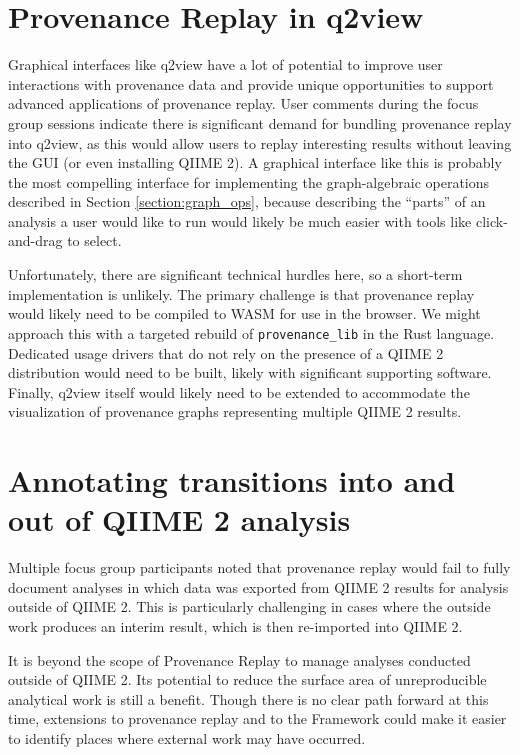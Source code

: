 \section{Provenance Replay in q2view \parencite[Issue 123]{qiime_2_development_team_issues_2016}}
Graphical interfaces like q2view have a lot of potential to improve user
interactions with provenance data and provide unique opportunities to support
advanced applications of provenance replay. User comments during the focus group
sessions indicate there is significant demand for bundling provenance replay
into q2view, as this would allow users to replay interesting results without
leaving the GUI (or even installing QIIME 2). A graphical interface like this is
probably the most compelling interface for implementing the graph-algebraic
operations described in Section \ref{section:graph_ops}, because describing
the “parts” of an analysis a user would like to run would likely be much easier
with tools like click-and-drag to select.

Unfortunately, there are significant technical hurdles here, so a short-term
implementation is unlikely. The primary challenge is that provenance replay would
likely need to be compiled to WASM for use in the browser. We might approach
this with a targeted rebuild of \texttt{provenance\_lib} in the Rust language.
Dedicated usage drivers that do not rely on the presence of a QIIME 2 distribution
would need to be built, likely with significant supporting software. Finally,
q2view itself would likely need to be extended to accommodate the visualization
of provenance graphs representing multiple QIIME 2 results.

\section{Annotating transitions into and out of QIIME 2 analysis \parencite[Issue 80]{keefe_issues_2021}}
Multiple focus group participants noted that provenance replay would fail to
fully document analyses in which data was exported from QIIME 2 results for
analysis outside of QIIME 2. This is particularly challenging in cases where the
outside work produces an interim result, which is then re-imported into QIIME 2.

It is beyond the scope of Provenance Replay to manage analyses conducted outside
of QIIME 2. Its potential to reduce the surface area of unreproducible
analytical work is still a benefit. Though there is no clear path forward at
this time, extensions to provenance replay and to the Framework could make it
easier to identify places where external work may have occurred.

